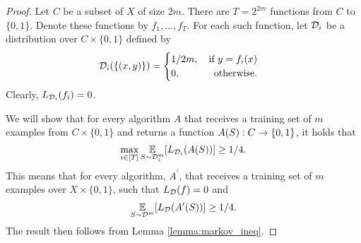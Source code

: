 \documentclass[11pt,a4paper]{article}
\begin{document}
\begin{proof}
Let $C$ be a subset of $X$ of size $2m$. There are $T = 2^{2m}$ functions from $C$ to $\{0,1\}$. Denote these functions by $f_1,\ldots,f_T$. For each such function, let $\mathcal{D}_i$ be a distribution over $C\times \{0,1\}$ defined by 
\begin{equation*}
    \mathcal{D}_i(\{(x,y)\}) = \begin{cases}
    1/2m,\quad\text{if }y = f_i(x)\\
    0,\hspace{1.2cm}\text{otherwise}.
    \end{cases}
\end{equation*}
Clearly, $L_{\mathcal{D}_i}(f_i) = 0$. 

We will show that for every algorithm $A$ that receives a training set of $m$ examples from $C\times \{0,1\}$ and returns a function $A(S):C\rightarrow \{0,1\}$, it holds that 
\begin{equation}\label{eqn:main_res_L_D}
    \max_{i\in[T]} \underset{S\sim \mathcal{D}_i^m}{\mathbb{E}}[L_{\mathcal{D}_i}(A(S))] \ge 1/4.
\end{equation}
This means that for every algorithm, $A^\prime$, that receives a training set of $m$ examples over $X\times \{0,1\}$, such that $L_{\mathcal{D}} (f) = 0$ and
\begin{equation*}
    \underset{S\sim \mathcal{D}^m}{\mathbb{E}}[L_{\mathcal{D}}(A^\prime(S))] \ge 1/4.
\end{equation*}
The result then follows from Lemma \ref{lemma:markov_ineq}.


\end{proof}
\end{document}
